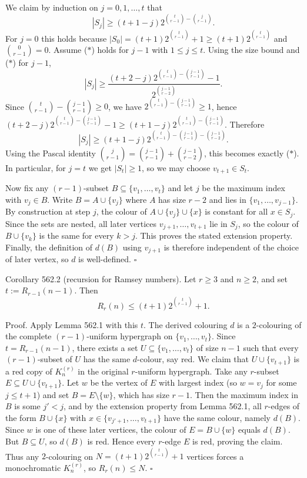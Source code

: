We claim by induction on $j=0,1,\dots,t$ that
\[
|S_j| \ge (t+1-j) 2^{\binom{t}{r-1} - \binom{j}{r-1}}. \tag{$*$}
\]
For $j=0$ this holds because $|S_0|=(t+1)2^{\binom{t}{r-1}}+1\ge (t+1)2^{\binom{t}{r-1}}$ and $\binom{0}{r-1}=0$.
Assume ($*$) holds for $j-1$ with $1\le j\le t$.
Using the size bound and ($*$) for $j-1$,
\[
|S_j|
\ge \frac{(t+2-j)2^{\binom{t}{r-1} - \binom{j-1}{r-1}}-1}{2^{\binom{j-1}{r-2}}}.
\]
Since $\binom{t}{r-1} - \binom{j-1}{r-1}\ge 0$, we have $2^{\binom{t}{r-1} - \binom{j-1}{r-1}}\ge 1$, hence
$(t+2-j)2^{\binom{t}{r-1} - \binom{j-1}{r-1}}-1\ge (t+1-j)2^{\binom{t}{r-1} - \binom{j-1}{r-1}}$.
Therefore
\[
|S_j| \ge (t+1-j)2^{\binom{t}{r-1} - \binom{j-1}{r-1} - \binom{j-1}{r-2}}.
\]
Using the Pascal identity $\binom{j}{r-1}=\binom{j-1}{r-1}+\binom{j-1}{r-2}$, this becomes exactly ($*$).
In particular, for $j=t$ we get $|S_t|\ge 1$, so we may choose $v_{t+1}\in S_t$.

Now fix any $(r-1)$-subset $B\subseteq\{v_1,\dots,v_t\}$ and let $j$ be the maximum index with $v_j\in B$.
Write $B=A\cup\{v_j\}$ where $A$ has size $r-2$ and lies in $\{v_1,\dots,v_{j-1}\}$.
By construction at step $j$, the colour of $A\cup\{v_j\}\cup\{x\}$ is constant for all $x\in S_j$.
Since the sets are nested, all later vertices $v_{j+1},\dots,v_{t+1}$ lie in $S_j$, so the colour of $B\cup\{v_k\}$ is the same for every $k>j$.
This proves the stated extension property.
Finally, the definition of $d(B)$ using $v_{j+1}$ is therefore independent of the choice of later vertex, so $d$ is well-defined. \hfill$\square$

Corollary 562.2 (recursion for Ramsey numbers).
Let $r\ge 3$ and $n\ge 2$, and set $t:=R_{r-1}(n-1)$. Then
\[
R_r(n) \le (t+1) 2^{\binom{t}{r-1}} + 1.
\]

Proof.
Apply Lemma 562.1 with this $t$. The derived colouring $d$ is a $2$-colouring of the complete $(r-1)$-uniform hypergraph on $\{v_1,\dots,v_t\}$.
Since $t=R_{r-1}(n-1)$, there exists a set $U\subseteq\{v_1,\dots,v_t\}$ of size $n-1$ such that every $(r-1)$-subset of $U$ has the same $d$-colour, say red.
We claim that $U\cup\{v_{t+1}\}$ is a red copy of $K_n^{(r)}$ in the original $r$-uniform hypergraph.
Take any $r$-subset $E\subseteq U\cup\{v_{t+1}\}$.
Let $w$ be the vertex of $E$ with largest index (so $w=v_j$ for some $j\le t+1$) and set $B=E\setminus\{w\}$, which has size $r-1$.
Then the maximum index in $B$ is some $j' < j$, and by the extension property from Lemma 562.1,
all $r$-edges of the form $B\cup\{x\}$ with $x\in\{v_{j'+1},\dots,v_{t+1}\}$ have the same colour, namely $d(B)$.
Since $w$ is one of these later vertices, the colour of $E=B\cup\{w\}$ equals $d(B)$.
But $B\subseteq U$, so $d(B)$ is red. Hence every $r$-edge $E$ is red, proving the claim.
Thus any $2$-colouring on $N=(t+1)2^{\binom{t}{r-1}}+1$ vertices forces a monochromatic $K_n^{(r)}$, so $R_r(n)\le N$. \hfill$\square$

